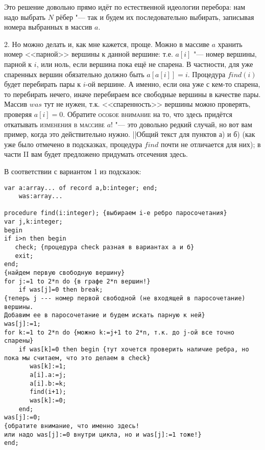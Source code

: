 Это решение довольно прямо идёт по естественной идеологии перебора: нам надо выбрать $N$ рёбер "--- так и будем их последовательно выбирать, записывая номера выбранных в массив $a$.
\par
2. Но можно делать и, как мне кажется, проще. Можно в массиве $a$ хранить номер <<парной>> вершины к данной вершине: т.е. $a[i]$ "--- 
номер вершины, парной к $i$, или ноль, 
если вершина пока ещё не спарена. В частности, для уже спаренных вершин обязательно должно быть $a[a[i]]=i$. Процедура $find(i)$ будет перебирать пары к 
$i$-ой вершине. А именно, если она уже с кем-то спарена, то перебирать нечего, 
иначе перебираем все свободные вершины в качестве пары. Массив $was$ тут не 
нужен, т.к. <<спаренность>> вершины можно проверять, проверяя $a[i]=0$. Обратите 
\textsc{особое внимание} на то, что здесь придётся откатывать \textsc{изменения в массиве} $a$! "--- это довольно редкий случай, но вот вам пример, когда это действительно нужно.
||Общий текст для пунктов а) и б) (как уже было отмечено в подсказках, процедура $find$ почти не отличается для них); в части II вам будет предложено придумать отсечения 
здесь.

В соответствии с вариантом 1 из подсказок:
\begin{codesampleo}\begin{verbatim}
var a:array... of record a,b:integer; end;
    was:array...
    
procedure find(i:integer); {выбираем i-е ребро паросочетания}
var j,k:integer;
begin
if i>n then begin
   check; {процедура check разная в вариантах а и б}
   exit;
end;
{найдем первую свободную вершину}
for j:=1 to 2*n do {в графе 2*n вершин!}
    if was[j]=0 then break;
{теперь j --- номер первой свободной (не входящей в паросочетание) вершины.
Добавим ее в паросочетание и будем искать парную к ней}
was[j]:=1;
for k:=1 to 2*n do {можно k:=j+1 to 2*n, т.к. до j-ой все точно спарены}
    if was[k]=0 then begin {тут хочется проверить наличие ребра, но пока мы считаем, что это делаем в check}
       was[k]:=1;
       a[i].a:=j;
       a[i].b:=k;
       find(i+1);
       was[k]:=0;
    end;
was[j]:=0;
{обратите внимание, что именно здесь!
или надо was[j]:=0 внутри цикла, но и was[j]:=1 тоже!}
end;
\end{verbatim}
\end{codesampleo}

